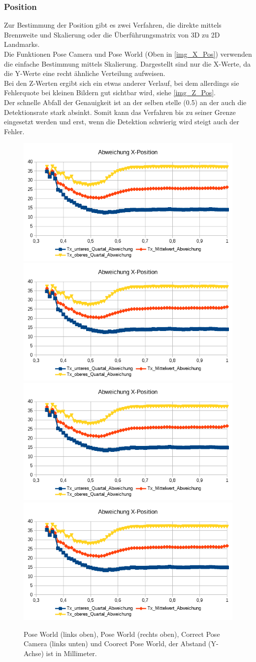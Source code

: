 \subsubsection{Position}
Zur Bestimmung der Position gibt es zwei Verfahren, die direkte mittels Brennweite und Skalierung oder die Überführungsmatrix von 3D zu 2D Landmarks.\\
Die Funktionen Pose Camera und Pose World (Oben in \autoref{img_X_Pos}) verwenden die einfache Bestimmung mittels Skalierung. Dargestellt sind nur die X-Werte, da die Y-Werte eine recht ähnliche Verteilung aufweisen.\\
Bei den Z-Werten ergibt sich ein etwas anderer Verlauf, bei dem allerdings sie Fehlerquote bei kleinen Bildern gut sichtbar wird, siehe \autoref{img_Z_Pos}.\\
Der schnelle Abfall der Genauigkeit ist an der selben stelle (0.5) an der auch die Detektionsrate stark absinkt. Somit kann das Verfahren bis zu seiner Grenze eingesetzt werden und erst, wenn die Detektion schwierig wird steigt auch der Fehler.
\begin{figure}
	\centering
	\includegraphics[width=0.45\linewidth]{tabelle/X_Pos_PC}
	\includegraphics[width=0.45\linewidth]{tabelle/X_Pos_PW}
	\includegraphics[width=0.45\linewidth]{tabelle/X_Pos_CPC}
	\includegraphics[width=0.45\linewidth]{tabelle/X_Pos_CPW}
	\caption{Pose World (links oben), Pose World (rechts oben), Correct Pose Camera (links unten) und Coorect Pose World, der Abstand (Y-Achse) ist in Millimeter.}
	\label{img_X_Pos}
\end{figure}
